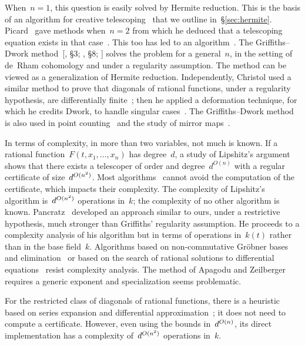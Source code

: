 \documentclass{sig-alternate}
\begin{document}
When~$n=1$, this question is easily solved by Hermite reduction.
This is the basis of an algorithm for creative telescoping~\cite{BosCheChy10} that we outline in~\S\ref{sec:hermite}.
Picard~\cite[chap.~7]{PicSim} gave methods when~$n=2$ from which he deduced that a telescoping equation exists in that case~\cite{Pic02}. This too has led to an algorithm~\cite{CheKauSin12}. 
The Griffiths--Dwork method~[, \S 3; , \S 8; ] solves the problem for a general~$n$, in the setting of de~Rham cohomology and under a regularity assumption.
The method can be viewed as a generalization of Hermite reduction.
Independently, Christol used a similar method to prove that diagonals of rational functions, under a regularity hypothesis, are differentially finite~\cite{Chr83}; then he applied a deformation technique, for which he credits Dwork, to handle singular cases~\cite{Chr85}.
The Griffiths--Dwork method is also used in point counting~\cite{AbbKedRoe10,Gerkmann07} and the study of mirror maps~\cite{Mor92}.

In terms of complexity, in more than two variables, not 
much is known.
If a rational function~$F(t,x_1,\dotsc,x_n)$ has degree~$d$, a study of Lipshitz's argument~\cite{Lip88} shows that there exists a telescoper of order and degree~$d^{O(n)}$ with a regular certificate of size~$d^{\smash{O(n^2)}}$.
Most algorithms~\cite{Lip88,Zei90,Takayama1990a,Chy00,ApaZei06,Kou10} cannot avoid the computation of the certificate, which impacts their complexity.
The complexity of Lipshitz's algorithm is~$d^{\smash{O(n^2)}}$ operations in~$k$; the complexity of no other algorithm is known.
Pancratz~\cite{Pan10} developed an approach similar to ours, under a restrictive hypothesis, much stronger than Griffiths' regularity assumption.
He proceeds to a complexity analysis of his algorithm but in terms of operations in~$k(t)$ rather than in the base field~$k$.
Algorithms based on non-commutative Gröbner bases and elimination~\cite{Zei90,Takayama1990a} or based on the search of rational solutions to differential equations~\cite{Chy00} resist complexity analysis.
The method of Apagodu and Zeilberger~\cite{ApaZei06} requires a generic exponent and specialization seems problematic.

For the restricted class of diagonals of rational functions, there is a heuristic based on series expansion and differential approximation~\cite{KauZei11}; it does not need to compute a certificate.
However, even using the bounds in~$d^{\smash{O(n)}}$, its direct implementation has a complexity of~$d^{\smash{O(n^2)}}$ operations in~$k$.
\end{document}
